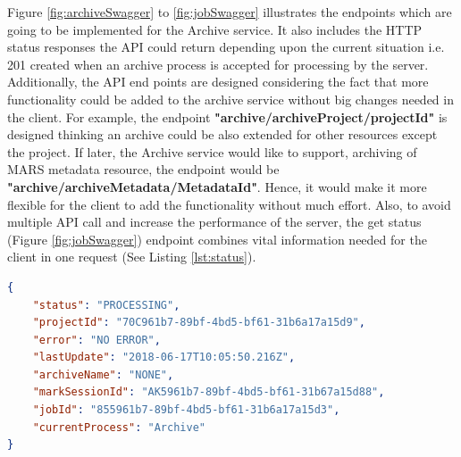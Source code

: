     Figure \ref{fig:archiveSwagger} to \ref{fig:jobSwagger} illustrates the endpoints which are going to be implemented for the Archive service. It also includes the HTTP 
    status responses the API could return depending upon the current situation i.e. 201 created when an archive process is accepted for processing by the server.
    Additionally, the API end points are designed considering the fact that more functionality could be added to the archive service without big changes needed in the client. 
    For example, the endpoint \textbf{"archive/archiveProject/{{projectId}}"} is designed thinking an archive could be also extended for other resources except the project. If later,
    the Archive service would like to support, archiving of MARS metadata resource, the endpoint would be \textbf{"archive/archiveMetadata/{{MetadataId}}"}.
    Hence, it would make it more flexible for the client to add the functionality without much effort. Also, to avoid multiple API call and
    increase the performance of the server, the get status (Figure \ref{fig:jobSwagger}) endpoint combines vital information needed for the client in one 
    request (See Listing \ref{lst:status}). 
    
\begin{lstlisting}[caption={Sucessful GET request for a archive status}, language=json,firstnumber=1, captionpos=b, label={lst:status}]
{
    "status": "PROCESSING",
    "projectId": "70C961b7-89bf-4bd5-bf61-31b6a17a15d9",
    "error": "NO ERROR",
    "lastUpdate": "2018-06-17T10:05:50.216Z",
    "archiveName": "NONE",
    "markSessionId": "AK5961b7-89bf-4bd5-bf61-31b67a15d88",
    "jobId": "855961b7-89bf-4bd5-bf61-31b6a17a15d3",
    "currentProcess": "Archive"
}
\end{lstlisting}







    
